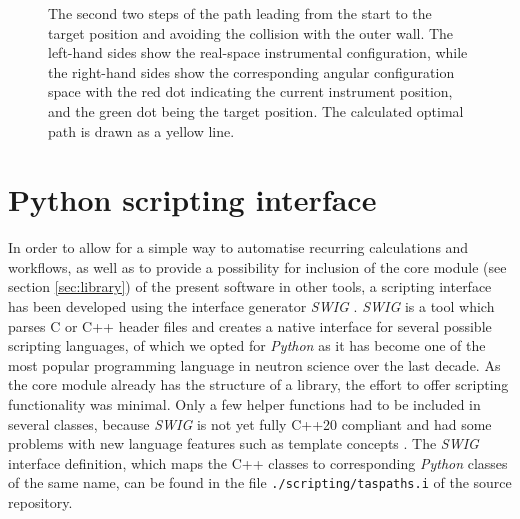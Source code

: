 \begin{figure}[htb]
\begin{center}
		\end{center}
	\caption[Case study: Path 2/2.]{The second two steps of the path leading from the start
		to the target position and avoiding the collision with the outer wall.
		The left-hand sides show the real-space instrumental configuration, while the right-hand
		sides show the corresponding angular configuration space with the red dot indicating the
		current instrument position, and the green dot being the target position.
		The calculated optimal path is drawn as a yellow line.
		\label{fig:casestudy_sequence2}}
\end{figure}



\section{Python scripting interface}
\label{sec:scripting}

In order to allow for a simple way to automatise recurring calculations and workflows, as well as to provide
a possibility for inclusion of the core module (see section \ref{sec:library}) of the present 
software in other tools, a scripting interface has been developed using the interface generator \textit{SWIG} \cite{web_swig}. 
\textit{SWIG} is a tool which parses C or C++ header files and creates a native interface 
for several possible scripting languages, of which we opted for \textit{Python} \cite{Rossum2011, web_python} 
as it has become one of the most popular programming language in neutron science over the last decade.
As the core module already has the structure of a library, the effort to offer scripting functionality
was minimal. Only a few helper functions had to be included in several classes, because \textit{SWIG}
is not yet fully C++20 compliant and had some problems with new language features such as 
template concepts \cite{cppwiki_concepts}.
The \textit{SWIG} interface definition, which maps the C++ classes to corresponding \textit{Python} 
classes of the same name, can be found in the file \lstinline|./scripting/taspaths.i| of the source repository.

